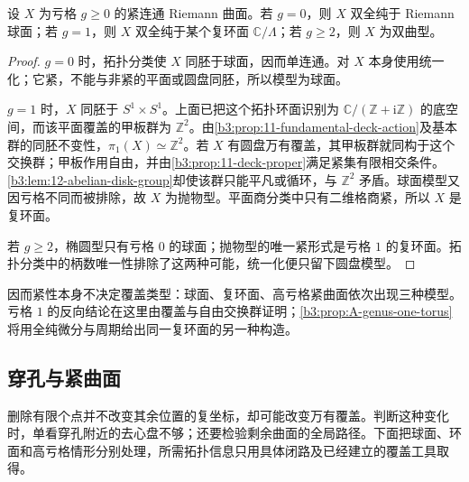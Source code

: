 \begin{proposition}[紧曲面的覆盖类型]\label{b3:prop:12-compact-genus-types}
设 \(X\) 为亏格 \(g\ge0\) 的紧连通 Riemann 曲面。若 \(g=0\)，则 \(X\) 双全纯于 Riemann 球面；若 \(g=1\)，则 \(X\) 双全纯于某个复环面 \(\mathbb C/\Lambda\)；若 \(g\ge2\)，则 \(X\) 为双曲型。
\end{proposition}
\begin{proof}
\(g=0\) 时，拓扑分类使 \(X\) 同胚于球面，因而单连通。对 \(X\) 本身使用统一化；它紧，不能与非紧的平面或圆盘同胚，所以模型为球面。

\(g=1\) 时，\(X\) 同胚于 \(S^1\times S^1\)。上面已把这个拓扑环面识别为 \(\mathbb C/(\mathbb Z+\mathrm i\mathbb Z)\) 的底空间，而该平面覆盖的甲板群为 \(\mathbb Z^2\)。由\cref{b3:prop:11-fundamental-deck-action}及基本群的同胚不变性，\(\pi_1(X)\simeq\mathbb Z^2\)。若 \(X\) 有圆盘万有覆盖，其甲板群就同构于这个交换群；甲板作用自由，并由\cref{b3:prop:11-deck-proper}满足紧集有限相交条件。\cref{b3:lem:12-abelian-disk-group}却使该群只能平凡或循环，与 \(\mathbb Z^2\) 矛盾。球面模型又因亏格不同而被排除，故 \(X\) 为抛物型。平面商分类中只有二维格商紧，所以 \(X\) 是复环面。

若 \(g\ge2\)，椭圆型只有亏格 \(0\) 的球面；抛物型的唯一紧形式是亏格 \(1\) 的复环面。拓扑分类中的柄数唯一性排除了这两种可能，统一化便只留下圆盘模型。
\end{proof}

因而紧性本身不决定覆盖类型：球面、复环面、高亏格紧曲面依次出现三种模型。亏格 \(1\) 的反向结论在这里由覆盖与自由交换群证明；\cref{b3:prop:A-genus-one-torus}将用全纯微分与周期给出同一复环面的另一种构造。

\subsection{穿孔与紧曲面}
\label{b3:subsec:120304}

删除有限个点并不改变其余位置的复坐标，却可能改变万有覆盖。判断这种变化时，单看穿孔附近的去心盘不够；还要检验剩余曲面的全局路径。下面把球面、环面和高亏格情形分别处理，所需拓扑信息只用具体闭路及已经建立的覆盖工具取得。

